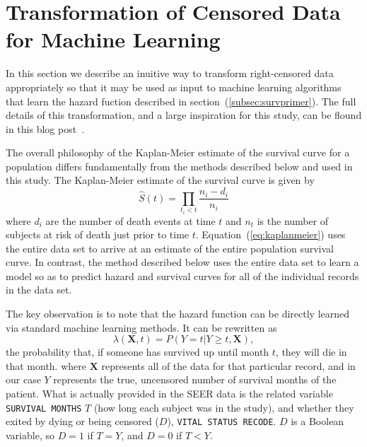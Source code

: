 \documentclass[a4paper,11pt]{article}
\newcommand{\codewhite}[1]{\colorbox{white}{\texttt{#1}}}
\begin{document}



















\section{Transformation of Censored Data for Machine Learning}
\label{subsec:transformation}

In this section we describe an inuitive way to transform right-censored data appropriately so that it may be used as input to machine learning algorithms that learn the hazard fuction described in section~(\ref{subsec:survprimer}). The full details of this transformation, and a large inspiration for this study, can be flound in this blog post~\cite{kuhn}.

The overall philosophy of the Kaplan-Meier estimate of the survival curve for a population differs fundamentally from the methods described below and used in this study. 
The Kaplan-Meier estimate of the survival curve is given by
\begin{equation}
\label{eq:kaplanmeier}
\hat{S}(t) = \prod_{t_i < t} \frac{n_i - d_i}{n_i}
\end{equation}
where $d_i$ are the number of death events at time $t$ and $n_t$ is the number of subjects at risk of death just prior to time $t$. 
Equation~(\ref{eq:kaplanmeier}) uses the entire data set to arrive at an estimate of the entire population survival curve. In contrast, the method described below uses the entire data set to learn a model so as to predict hazard and survival curves for all of the individual records in the data set.

The key observation is to note that the hazard function can be directly learned via standard machine learning methods. It can be rewritten as
\begin{equation}
\label{eq:hhazard}
\lambda(\mathbf{X}, t) = P(Y = t|Y \geq t, \mathbf{X}),
\end{equation}
the probability that, if someone has survived up until month $t$, they will die in that month.
where $\mathbf{X}$ represents all of the data for that particular record, and in our case $Y$ represents the true, uncensored number of survival months of the patient.
What is actually provided in the SEER data is the related variable \codewhite{SURVIVAL MONTHS} $T$ (how long each subject was in the study), and whether they exited by dying or being censored ($D$), \codewhite{VITAL STATUS RECODE}. 
$D$ is a Boolean variable, so $D = 1$ if $T = Y$, and $D = 0$ if $T < Y$.
\end{document}
